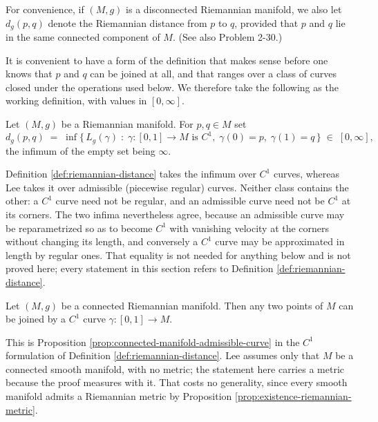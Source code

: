 For convenience, if $(M, g)$ is a disconnected Riemannian manifold, we also let $d_g(p,q)$ denote the Riemannian distance from $p$ to $q$, provided that $p$ and $q$ lie in the same connected component of $M$. (See also Problem 2-30.)

It is convenient to have a form of the definition that makes sense before one knows
that $p$ and $q$ can be joined at all, and that ranges over a class of curves closed
under the operations used below.  We therefore take the following as the working
definition, with values in $[0,\infty]$.

\begin{definition}
\label{def:riemannian-distance}
\mathlibok
{}
Let $(M,g)$ be a Riemannian manifold. For $p, q \in M$ set
\[
  d_g(p,q) \;=\; \inf \bigl\{\, L_g(\gamma) \;:\; \gamma : [0,1] \to M \text{ is } C^1,\;
    \gamma(0) = p,\; \gamma(1) = q \,\bigr\} \;\in\; [0, \infty],
\]
the infimum of the empty set being $\infty$.
\end{definition}

\begin{remark}
\label{rem:riemannian-distance-c1-vs-admissible}
Definition \ref{def:riemannian-distance} takes the infimum over $C^1$ curves, whereas
Lee takes it over admissible (piecewise regular) curves.  Neither class contains the
other: a $C^1$ curve need not be regular, and an admissible curve need not be $C^1$ at
its corners.  The two infima nevertheless agree, because an admissible curve may be
reparametrized so as to become $C^1$ with vanishing velocity at the corners without
changing its length, and conversely a $C^1$ curve may be approximated in length by
regular ones.  That equality is not needed for anything below and is not proved here;
every statement in this section refers to Definition \ref{def:riemannian-distance}.
\end{remark}

\begin{proposition}
\label{prop:connected-manifold-c1-curve}
\leanok
{}
Let $(M,g)$ be a connected Riemannian manifold. Then any two points of $M$ can be joined
by a $C^1$ curve $\gamma : [0,1] \to M$.

This is Proposition \ref{prop:connected-manifold-admissible-curve} in the $C^1$ formulation
of Definition \ref{def:riemannian-distance}. Lee assumes only that $M$ be a connected smooth
manifold, with no metric; the statement here carries a metric because the proof measures with
it. That costs no generality, since every smooth manifold admits a Riemannian metric by
Proposition \ref{prop:existence-riemannian-metric}.
\end{proposition}

